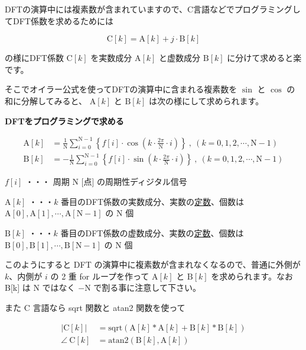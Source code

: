 \documentclass[a4paper]{jarticle}
\begin{document}

\bigskip
DFTの演算中には複素数が含まれていますので、C言語などでプログラミングしてDFT係数を求めるためには

\[
\textrm{C}[k] = \textrm{A}[k] + j \cdot \textrm{B}[k]
\]

\medskip
\noindent の様にDFT係数 $\textrm{C}[k]$ を実数成分 $\textrm{A}[k]$ と虚数成分 $\textrm{B}[k]$ に分けて求めると楽です。

\medskip
そこでオイラー公式を使ってDFTの演算中に含まれる複素数を $\sin$ と $\cos$ の和に分解してみると、 
$\textrm{A}[k]$ と $\textrm{B}[k]$ は次の様にして求められます。

\begin{framed}
\noindent\quad \textbf{DFTをプログラミングで求める}

\begin{align*}
\textrm{A}[k] &= \frac{1}{\textrm{N}} \sum_{i=0}^{\textrm{N}-1}
\left \{
f[i] \cdot \cos( k \cdot \frac{2\pi}{\textrm{N}} \cdot i ) 
\right \}
\ ,\  (k = 0, 1, 2, \cdots, \textrm{N}-1) \\
\textrm{B}[k] &= -\frac{1}{\textrm{N}} \sum_{i=0}^{\textrm{N}-1}
\left \{
f[i] \cdot \sin( k \cdot \frac{2\pi}{\textrm{N}} \cdot i )
\right \}
\ ,\  (k = 0, 1, 2, \cdots, \textrm{N}-1)
\end{align*}

\bigskip
\noindent\quad $f[i]$ ・・・ 周期 $\textrm{N}$ [点] の周期性ディジタル信号

\bigskip
\noindent\quad $\textrm{A}[k]$ ・・・$k$ 番目のDFT係数の実数成分、実数の\underline{定数}、個数は $\textrm{A}[0], \textrm{A}[1], \cdots, \textrm{A}[\textrm{N}-1]$ の $\textrm{N}$ 個 

\bigskip
\noindent\quad $\textrm{B}[k]$ ・・・$k$ 番目のDFT係数の虚数成分、実数の\underline{定数}、個数は $\textrm{B}[0], \textrm{B}[1], \cdots, \textrm{B}[\textrm{N}-1]$ の $\textrm{N}$ 個 
\end{framed}

\medskip
このようにすると DFT の演算中に複素数が含まれなくなるので、普通に外側が $k$、内側が $i$ の 2 重 for ループを作って $\textrm{A}[k]$ と $\textrm{B}[k]$ を求められます。なお \textrm{B}[k] は $\textrm{N}$ ではなく $-\textrm{N}$ で割る事に注意して下さい。

\medskip
また C 言語なら sqrt 関数と atan2 関数を使って

\begin{align*}
|\textrm{C}[k]| & = \textrm{sqrt}(\textrm{A}[k]*\textrm{A}[k] + \textrm{B}[k]*\textrm{B}[k]) \\
\angle \ \textrm{C}[k] & = \textrm{atan2}(\textrm{B}[k],\textrm{A}[k])
\end{align*}
\end{document}

